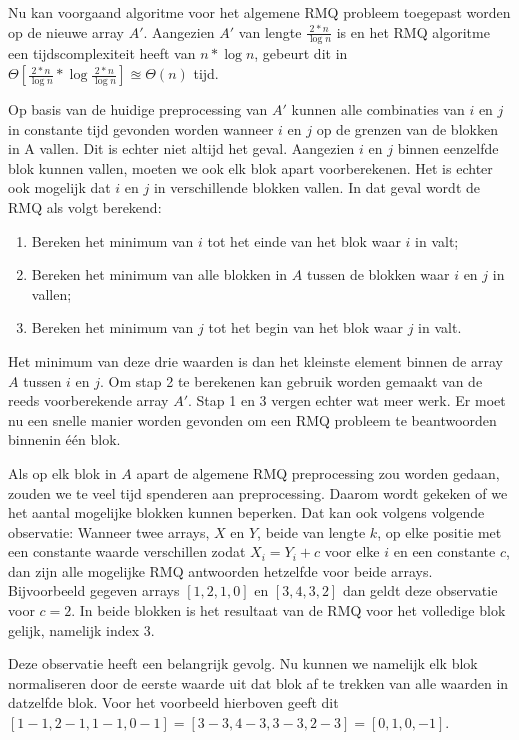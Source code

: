 Nu kan voorgaand algoritme voor het algemene RMQ probleem toegepast worden op 
de nieuwe array $A'$. Aangezien $A'$ van lengte $\frac{2*n}{\log{n}}$ is en 
het RMQ algoritme een tijdscomplexiteit heeft van $n * \log{n}$, gebeurt dit in 
$\Theta\left[\frac{2*n}{\log{n}} * \log{\frac{2*n}{\log{n}}}\right] \approxeq 
\Theta(n)$ tijd.

Op basis van de huidige preprocessing van $A'$ kunnen alle combinaties van $i$
en $j$ in constante tijd gevonden worden wanneer $i$ en $j$ op de grenzen van de
blokken in A vallen. Dit is echter niet altijd het geval. Aangezien $i$ en $j$
binnen eenzelfde blok kunnen vallen, moeten we ook elk blok apart voorberekenen.
Het is echter ook mogelijk dat $i$ en $j$ in verschillende blokken vallen. In
dat geval wordt de RMQ als volgt berekend:

\begin{enumerate}
\item Bereken het minimum van $i$ tot het einde van het blok waar $i$ in valt;
\item Bereken het minimum van alle blokken in $A$ tussen de blokken waar $i$ en
$j$ in vallen; 
\item Bereken het minimum van $j$ tot het begin van het blok waar $j$ in valt.
\end{enumerate}

Het minimum van deze drie waarden is dan het kleinste element binnen de array
$A$ tussen $i$ en $j$. Om stap 2 te berekenen kan gebruik worden gemaakt van de
reeds voorberekende array $A'$. Stap 1 en 3 vergen echter wat meer werk. Er moet
nu een snelle manier worden gevonden om een RMQ probleem te beantwoorden
binnenin één blok.

Als op elk blok in $A$ apart de algemene RMQ preprocessing zou worden gedaan,
zouden we te veel tijd spenderen aan preprocessing. Daarom wordt gekeken of we
het aantal mogelijke blokken kunnen beperken. Dat kan ook volgens
volgende observatie: Wanneer twee arrays, $X$ en $Y$, beide van lengte $k$, op
elke positie met een constante waarde verschillen zodat $X_i = Y_i + c$ voor
elke $i$ en een constante $c$, dan zijn alle mogelijke RMQ antwoorden hetzelfde
voor beide arrays. Bijvoorbeeld gegeven arrays $[1, 2, 1, 0]$ en $[3, 4, 3, 2]$
dan geldt deze observatie voor $c = 2$. In beide blokken is het resultaat van de
RMQ voor het volledige blok gelijk, namelijk index 3.

Deze observatie heeft een belangrijk gevolg. Nu kunnen we namelijk elk blok 
normaliseren door de eerste waarde uit dat blok af te trekken van alle waarden 
in datzelfde blok. Voor het voorbeeld hierboven geeft dit
$[1-1, 2-1, 1-1, 0-1] = [3-3, 4-3, 3-3, 2-3] = [0, 1, 0, -1]$. 

